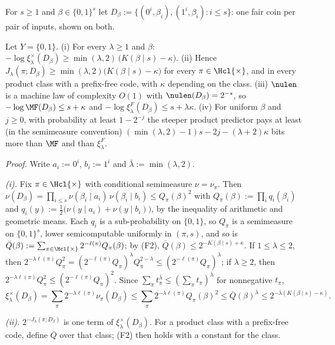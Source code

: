 For $s\ge1$ and $\beta\in\{0,1\}^s$ let $D_\beta:=\{(0^i,\beta_i),(1^i,\beta_i):i\le s\}$: one fair coin per pair of inputs, shown on both.

\begin{proposition}\label{prop:absorb:price}
Let $Y=\{0,1\}$.
(i) For every $\lambda\ge1$ and $\beta$: $-\log\xi^\times_\lambda(D_\beta)\ge\min(\lambda,2)\,\big(K(\beta\mid s)-\kappa\big)$. (ii) Hence $J_\lambda(\pi;D_\beta)\ge\min(\lambda,2)\big(K(\beta\mid s)-\kappa\big)$ for every $\pi\in\Hcl{\times}$, and in every product class with a prefix-free code, with $\kappa$ depending on the class. (iii) $\nulen$ is a machine law of complexity $O(1)$ with $\nulen(D_\beta)=2^{-s}$, so $-\log\MF(D_\beta)\le s+\kappa$ and $-\log\xi^F_\lambda(D_\beta)\le s+\lambda\kappa$. (iv) For uniform $\beta$ and $j\ge0$, with probability at least $1-2^{-j}$ the steeper product predictor pays at least (in the semimeasure convention) $(\min(\lambda,2)-1)s-2j-(\lambda+2)\kappa$ bits more than $\MF$ and than $\xi^F_\lambda$.
\end{proposition}

\emph{Proof.} Write $a_i:=0^i$, $b_i:=1^i$ and $\bar\lambda:=\min(\lambda,2)$.

\emph{(i).} Fix $\pi\in\Hcl{\times}$ with conditional semimeasure $\nu=\nu_\pi$. Then $\nu(D_\beta)=\prod_{i\le s}\nu(\beta_i\mid a_i)\,\nu(\beta_i\mid b_i)\le Q_\pi(\beta)^2$ with $Q_\pi(\beta):=\prod_iq_i(\beta_i)$ and $q_i(y):=\frac12\big(\nu(y\mid a_i)+\nu(y\mid b_i)\big)$, by the inequality of arithmetic and geometric means. Each $q_i$ is a sub-probability on $\{0,1\}$, so $Q_\pi$ is a semimeasure on $\{0,1\}^s$, lower semicomputable uniformly in $(\pi,s)$, and so is $\bar Q(\beta):=\sum_{\pi\in\Hcl{\times}}2^{-\ell(\pi)}Q_\pi(\beta)$; by (F2), $\bar Q(\beta)\le2^{-K(\beta\mid s)+\kappa}$. If $1\le\lambda\le2$, then $2^{-\lambda\ell(\pi)}Q_\pi^2=(2^{-\ell(\pi)}Q_\pi)^\lambda Q_\pi^{2-\lambda}\le(2^{-\ell(\pi)}Q_\pi)^\lambda$; if $\lambda\ge2$, then $2^{-\lambda\ell(\pi)}Q_\pi^2\le(2^{-\ell(\pi)}Q_\pi)^2$. Since $\sum_\pi t_\pi^{\bar\lambda}\le(\sum_\pi t_\pi)^{\bar\lambda}$ for nonnegative $t_\pi$,
\[
\xi^\times_\lambda(D_\beta)=\sum_\pi2^{-\lambda\ell(\pi)}\nu_\pi(D_\beta)\le\sum_\pi2^{-\lambda\ell(\pi)}Q_\pi(\beta)^2\le\bar Q(\beta)^{\bar\lambda}\le2^{-\bar\lambda(K(\beta\mid s)-\kappa)}.
\]

\emph{(ii).} $2^{-J_\lambda(\pi;D_\beta)}$ is one term of $\xi^\times_\lambda(D_\beta)$. For a product class with a prefix-free code, define $\bar Q$ over that class; (F2) then holds with a constant for the class.

